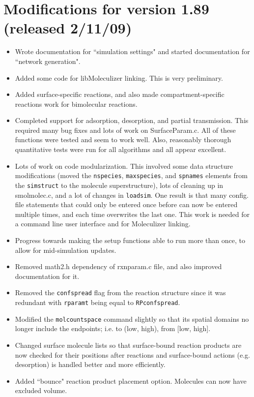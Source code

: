 \documentclass {scrbook}
\newcommand {\ttt} {\texttt}
\begin{document}
\section{Modifications for version 1.89 (released 2/11/09)}
\begin{itemize}
\item Wrote documentation for ``simulation settings" and started documentation for ``network generation".
\item Added some code for libMoleculizer linking. This is very preliminary.
\item Added surface-specific reactions, and also made compartment-specific reactions work for bimolecular reactions.
\item Completed support for adsorption, desorption, and partial transmission. This required many bug fixes and lots of work on SurfaceParam.c. All of these functions were tested and seem to work well. Also, reasonably thorough quantitative tests were run for all algorithms and all appear excellent.
\item Lots of work on code modularization. This involved some data structure modifications (moved the \ttt{nspecies}, \ttt{maxspecies}, and \ttt{spnames} elements from the \ttt{simstruct} to the molecule superstructure), lots of cleaning up in smolmolec.c, and a lot of changes in \ttt{loadsim}. One result is that many config. file statements that could only be entered once before can now be entered multiple times, and each time overwrites the last one. This work is needed for a command line user interface and for Moleculizer linking.
\item Progress towards making the setup functions able to run more than once, to allow for mid-simulation updates.
\item Removed math2.h dependency of rxnparam.c file, and also improved documentation for it.
\item Removed the \ttt{confspread} flag from the reaction structure since it was redundant with \ttt{rparamt} being equal to \ttt{RPconfspread}.
\item Modified the \ttt{molcountspace} command slightly so that its spatial domains no longer include the endpoints; i.e. to (low, high), from [low, high].
\item Changed surface molecule lists so that surface-bound reaction products are now checked for their positions after reactions and surface-bound actions (e.g. desorption) is handled better and more efficiently.
\item Added ``bounce" reaction product placement option. Molecules can now have excluded volume.
\end{itemize}
\end{document}
